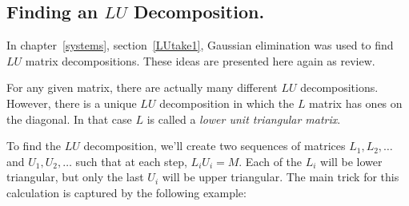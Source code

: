 


\subsection{Finding an $LU$ Decomposition.}
\label{finding_LU_decomp}

In chapter~\ref{systems}, section~\ref{LUtake1}, Gaussian elimination was used to find~$LU$ matrix decompositions.  
These ideas are presented here again as review.
 
For any given matrix, there are actually many different $LU$ decompositions.  However, there is a unique $LU$ decomposition in which the $L$ matrix has ones on the diagonal. In that case $L$ is called a \emph{lower unit triangular matrix}.

To find the $LU$ decomposition, we'll create two sequences of matrices $L_1, L_2,\ldots$ and $U_1, U_2, \ldots$ such that at each step, $L_iU_i=M$.  Each of the $L_i$ will be lower triangular, but only the last $U_i$ will be upper triangular.
 The main trick for this calculation is captured by the following example:

